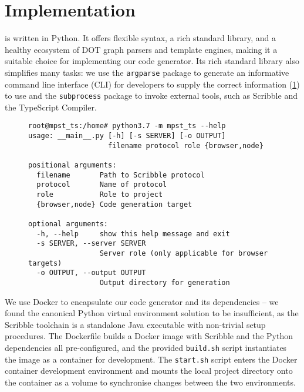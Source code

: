 \section{Implementation}

\codegen is written in Python. 
It offers flexible syntax, a rich standard library, and 
a healthy ecosystem of DOT graph parsers and template engines,
making it a suitable choice for implementing our code generator.
Its rich standard library also simplifies many tasks: we use
the \texttt{argparse} package to generate an informative
command line interface (CLI) for developers to 
supply the correct information (\cref{lst:cmdline})
to use \codegen
and the \texttt{subprocess} package to 
invoke external tools, such as Scribble and the TypeScript Compiler.

\begin{figure}[!ht]
\begin{lstlisting}
root@mpst_ts:/home# python3.7 -m mpst_ts --help
usage: __main__.py [-h] [-s SERVER] [-o OUTPUT]
                   filename protocol role {browser,node}

positional arguments:
  filename       Path to Scribble protocol
  protocol       Name of protocol
  role           Role to project
  {browser,node} Code generation target

optional arguments:
  -h, --help     show this help message and exit
  -s SERVER, --server SERVER
                 Server role (only applicable for browser targets)
  -o OUTPUT, --output OUTPUT
                 Output directory for generation
\end{lstlisting}
\label{lst:cmdline}
\end{figure}

We use Docker \cite{docker} to encapsulate our code generator
and its dependencies -- 
we found the canonical Python virtual environment
solution to be insufficient, as the Scribble toolchain is
a standalone Java executable with non-trivial setup procedures.
The Dockerfile builds a Docker image with Scribble and
the Python dependencies all pre-configured, and the provided
\texttt{build.sh} script instantiates the image as a container 
for development.
The \texttt{start.sh} script enters the Docker container
development environment and mounts the local project directory
onto the container as a volume to synchronise changes between the
two environments.